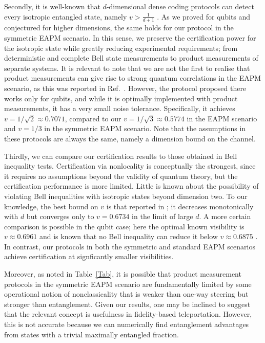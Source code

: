 \documentclass[aps,superscriptaddress,twocolumn,twoside,floatfix,pra,nofootinbib,a4paper]{revtex4-2}
\begin{document}
Secondly, it is well-known that $d$-dimensional dense coding protocols can detect every isotropic entangled state, namely $v>\frac{1}{d+1}$ \cite{Abbott2018}. As we proved for qubits and conjectured for  higher dimensions, the same holds for our protocol in the symmetric EAPM scenario. In this sense, we preserve the certification power for the isotropic state while greatly reducing experimental requirements; from deterministic and complete Bell state measurements to product measurements of separate systems. It is relevant to note that we are not the first to realise that product measurements can give rise to strong quantum correlations in the EAPM scenario, as this was reported in Ref.~\cite{Piveteau2022}. However, the protocol proposed there works only for qubits, and while it is optimally implemented with product measurements, it has a very small noise tolerance. Specifically, it achieves $v=1/\sqrt{2}\approx 0.7071$, compared to our $v=1/\sqrt{3}\approx 0.5774$ in the EAPM scenario and $v=1/3$ in the symmetric EAPM scenario. Note that the assumptions in these protocols are always the same, namely a dimension bound on the channel.

Thirdly, we can compare our certification results to those obtained in Bell inequality tests. Certification via nonlocality is conceptually the strongest, since it requires no assumptions beyond the validity of quantum theory, but the certification performance is more limited. Little is known about the possibility of violating Bell inequalities with isotropic states beyond dimension two. To our knowledge, the best bound on $v$ is that reported in \cite{Collins2002}; it  decreases monotonically with $d$ but converges only to $v=0.6734$ in the limit of large $d$. A more certain comparison is possible in the qubit case; here the  optimal known visibility is $v\approx 0.6961$ and is known that no Bell inequality can reduce it below   $v\approx 0.6875$ \cite{Designolle2023}. In contrast, our protocols in both the symmetric and standard EAPM scenarios achieve certification at signficantly smaller visibilities.
	
Moreover, as noted in Table~\ref{Tab}, it is possible that  product measurement protocols in the symmetric EAPM scenario are fundamentally limited by some operational notion of nonclassicality that is  weaker than one-way steering but stronger than entanglement. Given our results, one may be inclined to suggest that the relevant concept is usefulness in fidelity-based teleportation. However, this is not accurate because we can numerically find entanglement advantages from states with a trivial maximally entangled fraction. 
\end{document}
